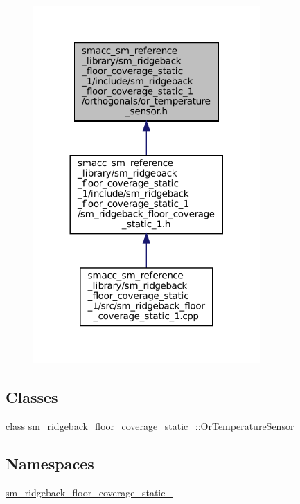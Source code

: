 \nopagebreak
\begin{figure}[H]
\begin{center}
\leavevmode
\includegraphics[width=245pt]{sm__ridgeback__floor__coverage__static__1_2include_2sm__ridgeback__floor__coverage__static__1_2o685ffea6e196800f84a1839221941632}
\end{center}
\end{figure}
\subsection*{Classes}
\begin{DoxyCompactItemize}
\item 
class \hyperlink{classsm__ridgeback__floor__coverage__static__1_1_1OrTemperatureSensor}{sm\+\_\+ridgeback\+\_\+floor\+\_\+coverage\+\_\+static\+\_\+::\+Or\+Temperature\+Sensor}
\end{DoxyCompactItemize}
\subsection*{Namespaces}
\begin{DoxyCompactItemize}
\item 
 \hyperlink{namespacesm__ridgeback__floor__coverage__static__1}{sm\+\_\+ridgeback\+\_\+floor\+\_\+coverage\+\_\+static\+\_}
\end{DoxyCompactItemize}
